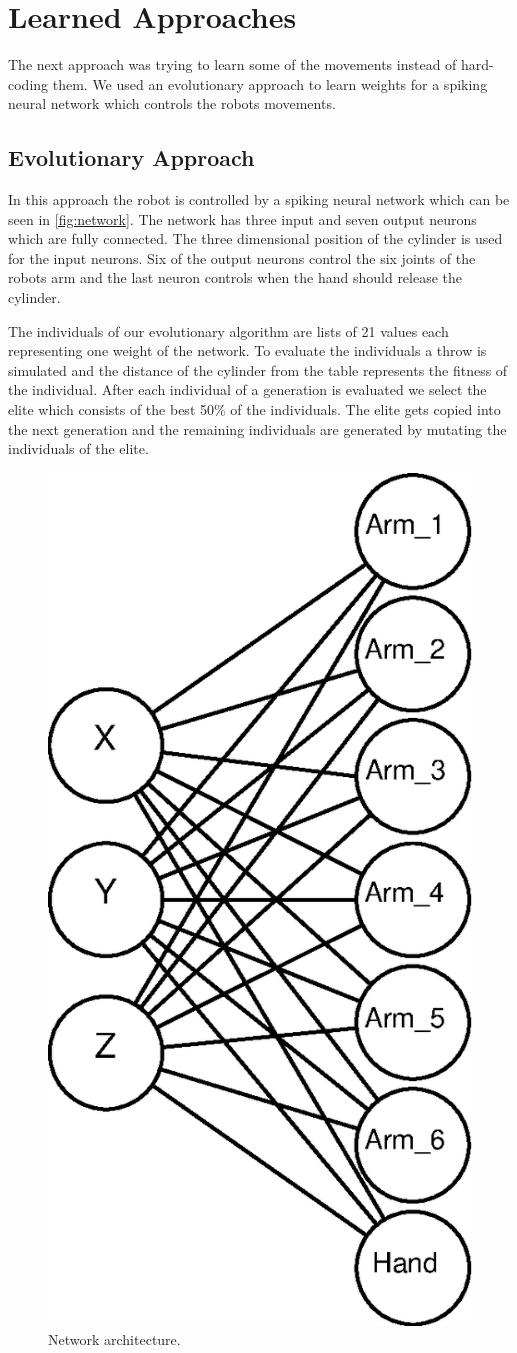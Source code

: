 \section{Learned Approaches}
\label{sec:learned}
The next approach was trying to learn some of the movements instead of hard-coding them.
We used an evolutionary approach to learn weights for a spiking neural network which controls the robots movements.

\subsection{Evolutionary Approach}
In this approach the robot is controlled by a spiking neural network which can be seen in \autoref{fig:network}.
The network has three input and seven output neurons which are fully connected.
The three dimensional position of the cylinder is used for the input neurons.
Six of the output neurons control the six joints of the robots arm and the last neuron controls when the hand should release the cylinder.

The individuals of our evolutionary algorithm are lists of 21 values each representing one weight of the network.
To evaluate the individuals a throw is simulated and the distance of the cylinder from the table represents the fitness of the individual.
After each individual of a generation is evaluated we select the elite which consists of the best 50\% of the individuals.
The elite gets copied into the next generation and the remaining individuals are generated by mutating the individuals of the elite.

\begin{figure}[h]
\centering
\includegraphics[width=.5\columnwidth]{figures/net.eps}
\caption{Network architecture.}
\label{fig:network}
\end{figure}

